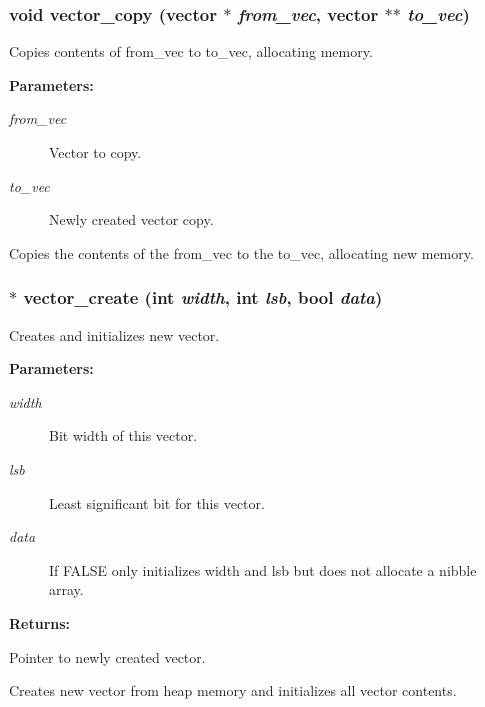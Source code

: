 \subsubsection{\setlength{\rightskip}{0pt plus 5cm}void vector\_\-copy ({\bf vector} $\ast$ {\em from\_\-vec}, {\bf vector} $\ast$$\ast$ {\em to\_\-vec})}\label{vector_8h_a2}


Copies contents of from\_\-vec to to\_\-vec, allocating memory.

\begin{Desc}
\item[{\bf Parameters: }]\par
\begin{description}
\item[
{\em from\_\-vec}]Vector to copy. \item[
{\em to\_\-vec}]Newly created vector copy.

\end{description}
\end{Desc}
Copies the contents of the from\_\-vec to the to\_\-vec, allocating new memory. 
\subsubsection{$\ast$ vector\_\-create (int {\em width}, int {\em lsb}, {\bf bool} {\em data})}\label{vector_8h_a1}


Creates and initializes new vector.

\begin{Desc}
\item[{\bf Parameters: }]\par
\begin{description}
\item[
{\em width}]Bit width of this vector. \item[
{\em lsb}]Least significant bit for this vector. \item[
{\em data}]If FALSE only initializes width and lsb but does not allocate a nibble array.

\end{description}
\end{Desc}
\begin{Desc}
\item[{\bf Returns: }]\par
Pointer to newly created vector.

\end{Desc}
Creates new vector from heap memory and initializes all vector contents. 

